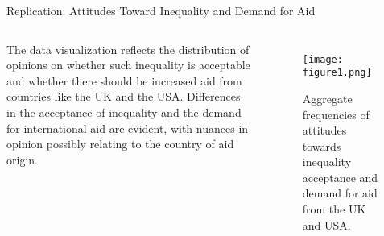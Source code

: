 \documentclass[aspectratio=169,10pt,compress]{beamer}
\begin{document}
      
 \begin{frame}{Replication: Attitudes Toward Inequality and Demand for Aid}
  \begin{columns}
    \hspace*{1.5cm} %
    \begin{minipage}{\dimexpr\linewidth-2cm} %
       The data visualization reflects the distribution of opinions on whether such inequality is acceptable and whether there should be increased aid from countries like the UK and the USA. Differences in the acceptance of inequality and the demand for international aid are evident, with nuances in opinion possibly relating to the country of aid origin.
    \end{minipage}

    \begin{figure}
      \centering
      \texttt{[image: figure1.png]} %
      \caption{Aggregate frequencies of attitudes towards inequality acceptance and demand for aid from the UK and USA.}
    \end{figure}
  \end{columns}
\end{frame}
\end{document}
